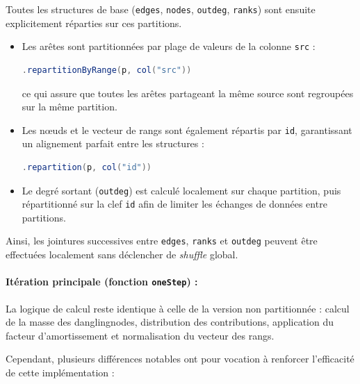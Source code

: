 \documentclass[conference]{IEEEtran}
\begin{document}
Toutes les structures de base (\texttt{edges}, \texttt{nodes}, \texttt{outdeg}, \texttt{ranks}) sont ensuite explicitement réparties sur ces partitions.

\begin{itemize}
  \item Les arêtes sont partitionnées par plage de valeurs de la colonne \texttt{src} :
  \begin{lstlisting}[language=Scala]
.repartitionByRange(p, col("src"))
  \end{lstlisting}
  ce qui assure que toutes les arêtes partageant la même source sont regroupées sur la même partition.

  \item Les nœuds et le vecteur de rangs sont également répartis par \texttt{id}, garantissant un alignement parfait entre les structures :
  \begin{lstlisting}[language=Scala]
.repartition(p, col("id"))
  \end{lstlisting}

  \item Le degré sortant (\texttt{outdeg}) est calculé localement sur chaque partition, puis répartitionné sur la clef \texttt{id} afin de limiter les échanges de données entre partitions.
\end{itemize}

Ainsi, les jointures successives entre \texttt{edges}, \texttt{ranks} et \texttt{outdeg} peuvent être effectuées localement sans déclencher de \textit{shuffle} global.

\paragraph{Itération principale (fonction \texttt{oneStep}) :}

La logique de calcul reste identique à celle de la version non partitionnée :  
calcul de la masse des \glspl{danglingnode}, distribution des contributions, application du facteur d'amortissement et normalisation du vecteur des rangs.  

Cependant, plusieurs différences notables ont pour vocation à renforcer l'efficacité de cette implémentation :
\end{document}
